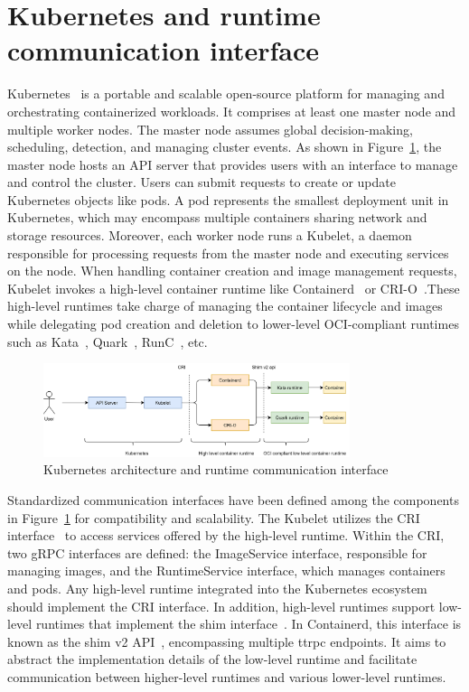 \section{Kubernetes and runtime communication interface}
\label{sec:k8s}
Kubernetes~\cite*{k8s} is a portable and scalable open-source platform for managing and orchestrating containerized workloads. It comprises at least one master node and multiple worker nodes. The master node assumes global decision-making, scheduling, detection, and managing cluster events. As shown in Figure~\ref{fig:k8s}, 
the master node hosts an API server that provides users with an interface to manage and control the cluster. Users can submit requests to create or update  Kubernetes objects like pods. A pod represents the smallest deployment unit in Kubernetes, which may encompass multiple containers sharing network 
and storage resources. Moreover, each worker node runs a Kubelet, a daemon responsible for processing requests from the master node and executing services on the node. When handling container creation and image management requests, Kubelet invokes a high-level container runtime like 
Containerd~\cite*{containerd} or CRI-O~\cite*{cri-o}.These high-level runtimes take charge of managing the container lifecycle and images while delegating pod creation and 
deletion to lower-level OCI-compliant runtimes such as Kata~\cite*{Kata-Containers}, Quark~\cite*{quark}, RunC~\cite*{runc}, etc.
\begin{figure}[htp]
  \centering
  \includegraphics[width=0.8\textwidth]{images/k8s.PNG}
  \caption[Kubernetes architecture and runtime communication interface]{Kubernetes architecture and runtime communication interface}
  \label{fig:k8s}
\end{figure}

Standardized communication interfaces have been defined among the components in Figure~\ref{fig:k8s} for compatibility and scalability. The Kubelet utilizes the CRI interface~\cite*{cri-interface} to access services offered by the high-level runtime. Within the CRI, two gRPC interfaces are defined: the ImageService 
interface, responsible for managing images, and the RuntimeService interface, which manages containers and pods. Any high-level runtime integrated into the Kubernetes ecosystem should implement the CRI interface. In addition, high-level runtimes support low-level runtimes that implement the shim interface~\cite*{shim_v2, cri0_shim_v2}. 
In Containerd, this interface is known as the shim v2 API~\cite*{shim_v2}, encompassing multiple ttrpc endpoints. It aims to abstract the implementation details of the low-level runtime and facilitate communication between higher-level runtimes and various lower-level runtimes.


